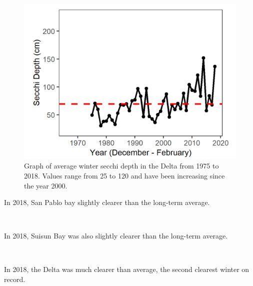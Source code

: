 \documentclass[
]{book}
\begin{document}
\begin{panel-grid}
\begin{columns-nocenter}
\begin{column800}
\begin{expand}
\begin{figure}
\includegraphics[width=15.25in]{figures/secchi_dtwinter} \caption{Graph of average winter secchi depth in the Delta from 1975 to 2018. Values range from 25 to 120 and have been increasing since the year 2000.}\label{fig:unnamed-chunk-148}
\end{figure}

\end{expand}

\end{column800}

\end{columns-nocenter}

\begin{columns-nocenter}

\begin{column800}

In 2018, San Pablo bay slightly clearer than the long-term average.

\end{column800}

\begin{column40}

~

\end{column40}

\begin{column800}

In 2018, Suisun Bay was also slightly clearer than the long-term average.

\end{column800}

\begin{column40}

~

\end{column40}

\begin{column800}

In 2018, the Delta was much clearer than average, the second clearest winter on record.

\end{column800}

\end{columns-nocenter}

\end{panel-grid}
\end{document}

